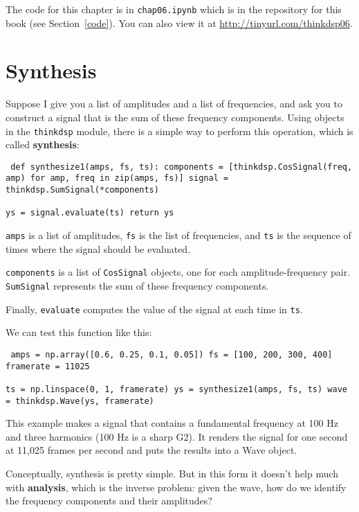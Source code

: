 \documentclass[12pt]{book} \usepackage[width=5.5in,height=8.5in, hmarginratio=3:2,vmarginratio=1:1]{geometry}
\begin{document}
The code for this chapter is in {\tt chap06.ipynb} which is in the repository for this book (see Section~\ref{code}). You can also view it at \url{http://tinyurl.com/thinkdsp06}. 

\section{Synthesis} \label{synth1} 

Suppose I give you a list of amplitudes and a list of frequencies, and ask you to construct a signal that is the sum of these frequency components. Using objects in the {\tt thinkdsp} module, there is a simple way to perform this operation, which is called {\bf synthesis}: 

\begin{verbatim} def synthesize1(amps, fs, ts): components = [thinkdsp.CosSignal(freq, amp) for amp, freq in zip(amps, fs)] signal = thinkdsp.SumSignal(*components) 

ys = signal.evaluate(ts) return ys \end{verbatim} 

{\tt amps} is a list of amplitudes, {\tt fs} is the list of frequencies, and {\tt ts} is the sequence of times where the signal should be evaluated. 

{\tt components} is a list of {\tt CosSignal} objects, one for each amplitude-frequency pair. {\tt SumSignal} represents the sum of these frequency components. 

Finally, {\tt evaluate} computes the value of the signal at each time in {\tt ts}. 

We can test this function like this: 

\begin{verbatim} amps = np.array([0.6, 0.25, 0.1, 0.05]) fs = [100, 200, 300, 400] framerate = 11025 

ts = np.linspace(0, 1, framerate) ys = synthesize1(amps, fs, ts) wave = thinkdsp.Wave(ys, framerate) \end{verbatim} 

This example makes a signal that contains a fundamental frequency at 100 Hz and three harmonics (100 Hz is a sharp G2). It renders the signal for one second at 11,025 frames per second and puts the results into a Wave object. 

Conceptually, synthesis is pretty simple. But in this form it doesn't help much with {\bf analysis}, which is the inverse problem: given the wave, how do we identify the frequency components and their amplitudes? 
\end{document}
